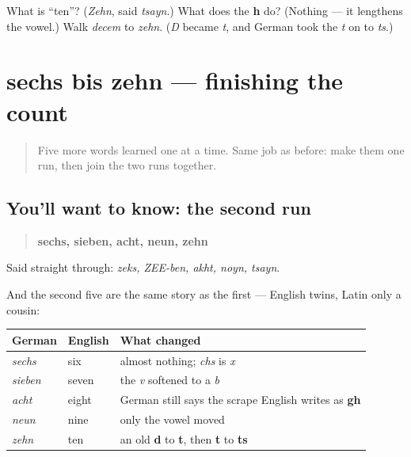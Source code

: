 \begin{tcolorbox}[breakable,colback=teal!4,colframe=teal!35!black,title={Before you move on}]
What is \textquotedblleft{}ten\textquotedblright{}? (\emph{Zehn}, said \emph{tsayn}.) What does the \textbf{h} do? (Nothing — it lengthens the vowel.) Walk \emph{decem} to \emph{zehn}. (\emph{D} became \emph{t}, and German took the \emph{t} on to \emph{ts}.)
\end{tcolorbox}
\section[Practice]{sechs bis zehn — finishing the count}

\label{lesson:GE-C06-zahlen-6-10}



\begin{quote}
Five more words learned one at a time. Same job as before: make them one run, then join the two runs together.
\end{quote}

\subsection*{You'll want to know: the second run}
\begin{quote}
\textbf{sechs, sieben, acht, neun, zehn}
\end{quote}

Said straight through: \emph{zeks, ZEE-ben, akht, noyn, tsayn}.

And the second five are the same story as the first — English twins, Latin only a cousin:

\noindent
\begin{tabularx}{\linewidth}{@{}>{\raggedright\arraybackslash}X>{\raggedright\arraybackslash}X>{\raggedright\arraybackslash}X@{}}
\toprule
\textbf{German} & \textbf{English} & \textbf{What changed} \\
\midrule
\emph{sechs} & six & almost nothing; \emph{chs} is \emph{x} \\
\emph{sieben} & seven & the \emph{v} softened to a \emph{b} \\
\emph{acht} & eight & German still says the scrape English writes as \textbf{gh} \\
\emph{neun} & nine & only the vowel moved \\
\emph{zehn} & ten & an old \textbf{d} to \textbf{t}, then \textbf{t} to \textbf{ts} \\
\bottomrule
\end{tabularx}

